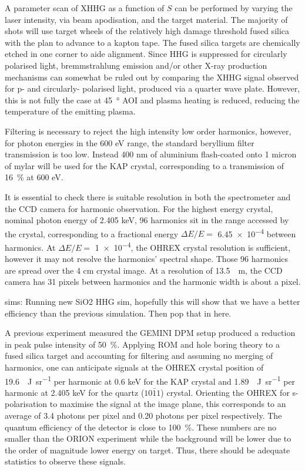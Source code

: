 A parameter scan of \ac{XHHG} as a function of $S$ can be performed by varying the laser intensity, via beam apodisation, and the target material. The majority of shots will use target wheels of the relatively high damage threshold fused silica with the plan to advance to a kapton tape. The fused silica targets are chemically etched in one corner to aide alignment.
Since HHG is suppressed for circularly polarised light, bremmstrahlung emission and/or other X-ray production mechanisms can somewhat be ruled out by comparing the \ac{XHHG} signal observed for p- and circularly- polarised light, produced via a quarter wave plate. However, this is not fully the case at \qty{45}{\degree} \ac{AOI} and plasma heating is reduced, reducing the temperature of the emitting plasma.

Filtering is necessary to reject the high intensity low order harmonics, however, for photon energies in the 600 eV range, the standard beryllium filter transmission is too low. Instead 400 nm of aluminium flash-coated onto 1 micron of mylar will be used for the KAP crystal, corresponding to a transmission of \qty{16}{\%} at 600 eV.

It is essential to check there is suitable resolution in both the spectrometer and the CCD camera for harmonic observation. For the highest energy crystal, nominal photon energy of 2.405 keV, 96 harmonics sit in the range accessed by the crystal, corresponding to a fractional energy $\Delta E/E =$ \num{6.45e-4} between harmonics. At  $\Delta E/E =$ \num{1e-4}, the OHREX crystal resolution is sufficient, however it may not resolve the harmonics' spectral shape. Those 96 harmonics are spread over the 4 cm crystal image. At a resolution of \qty{13.5}{\mu m}, the CCD camera has 31 pixels between harmonics and the harmonic width is about a pixel.

sims:
Running new SiO2 HHG sim, hopefully this will show that we have a better efficiency than the previous simulation. Then pop that in here.

A previous experiment measured the GEMINI DPM setup produced a reduction in peak pulse intensity of \qty{50}{\%}. Applying ROM and hole boring theory to a fused silica target and accounting for filtering and assuming no merging of harmonics, one can anticipate signals at the OHREX crystal position of \qty{19.6}{\mu J.sr^{-1}} per harmonic at 0.6 keV for the KAP crystal and \qty{1.89}{\mu J.sr^{-1}} per harmonic at 2.405 keV for the quartz ($10\bar{1}1$) crystal. Orienting the OHREX for s-polarisation to maximise the signal at the image plane, this corresponds to an average of 3.4 photons per pixel and 0.20 photons per pixel respectively. The quantum efficiency of the detector is close to \qty{100}{\%}. These numbers are no smaller than the ORION experiment while the background will be lower due to the order of magnitude lower energy on target. Thus, there should be adequate statistics to observe these signals.

